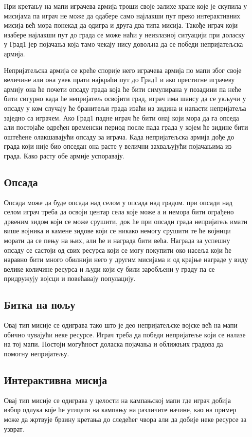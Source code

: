 \documentclass[11pt,a4paper]{article}
\begin{document}
При кретању на мапи играчева армија троши своје залихе хране које је скупила у мисијама па играч не може да одабере само најлакши пут преко интерактивних мисија већ мора понекад да одигра и друга два типа мисија. Такође играч који изабере најлакши пут до града се може наћи у неизлазној ситуацији при доласку у Град1 јер појачања која тамо чекају нису довољна да се победи непријатељска армија.

Непријатељска армија се креће спорије него играчева армија по мапи због своје величине али она увек прати најкраћи пут до Град1 и ако престигне играчеву армију она ће почети опсаду града која ће бити симулирана у позадини па неће бити сигурно када ће непријатељ освојити град, играч има шансу да се укључи у опсаду у ком случају ће бранитељи града изаћи из зидина и напасти непријатеља заједно са играчем. Ако Град1 падне играч ће бити онај који мора да га опседа али постојаће одређен временски период после пада града у којем ће зидине бити оштећене олакшавајући опсаду за играча. Када непријатељска армија дође до града који није био опседан она расте у велични захваљујући појачањима из града. Како расту обе армије успоравају.
\subsection{Опсада}
Опсада може да буде опсада над селом у опсада над градом. при опсади над селом играч треба да освоји центар села које може а и немора бити ограђено дрвеним зидом који се може срушити, док ће при опсади града непријатељ имати више војника и камене зидове који се никако немогу срушити те ће војници морати да се пењу на њих, али ће и  награда бити већа. Награда за успешну опсаду се састоји од свих ресурса који се могу покупити око насеља  који ће наравно бити много обилнији него у другим мисијама и од крајње награде у виду велике количине ресурса и људи који су били заробљени у граду па се придружују војсци и повећавају популацију.
\subsection{Битка на пољу}
Овај тип мисије се одиграва тако што је део непријатељске војске већ на мапи обично чувајући неке ресурсе. Играч треба да победи непријатеље који се налазе на тој мапи. Постоји могућност доласка појачања и оближњих градова да помогну непријатељу.
\subsection{Интерактивна мисија}
Овај тип мисије се одиграва у целости на кампањској мапи где играч добија избор одлука које ће утицати на кампању на различите начине, као на пример може да жртвује брзину кретања до следећег чвора али да добије неке ресурсе за узврат.
\end{document}
